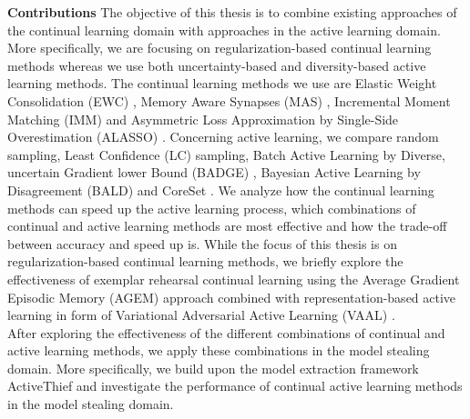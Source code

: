 \textbf{Contributions} \hspace{0.2cm} The objective of this thesis is to combine existing approaches of the continual learning domain
 with approaches in the active learning domain. More specifically, we are focusing on regularization-based continual learning methods
whereas we use both uncertainty-based and diversity-based active learning methods. The continual learning methods we use are Elastic
Weight Consolidation (EWC) \cite{Kirkpatrick2017}, Memory Aware Synapses (MAS) \cite{aljundi2018memory}, Incremental Moment Matching
(IMM) \cite{lee2017overcoming} and Asymmetric Loss Approximation by Single-Side Overestimation (ALASSO) \cite{park2019continual}.
Concerning active learning, we compare random sampling, Least Confidence (LC) \cite{lewis1994sequential} sampling, Batch Active Learning by
Diverse, uncertain Gradient lower Bound (BADGE) \cite{ash2019deep}, Bayesian Active Learning by Disagreement (BALD) \cite{houlsby2011bayesian} and
CoreSet \cite{sener2017active}.
We analyze how the continual learning methods can speed up the active learning process, which combinations of continual and active learning methods
are most effective and how the trade-off between accuracy and speed up is. While the focus of this thesis is on regularization-based continual
learning methods, we briefly explore the effectiveness of exemplar rehearsal continual learning using the Average Gradient Episodic Memory (AGEM)
approach \cite{chaudhry2018efficient} combined with representation-based active learning in form of Variational Adversarial Active Learning (VAAL)
\cite{sinha2019variational}. \\
After exploring the effectiveness of the different combinations of continual and active learning methods, we apply these combinations in the model stealing
domain. More specifically, we build upon the model extraction framework ActiveThief \cite{pal2020activethief} and investigate the performance of continual
active learning methods in the model stealing domain.
